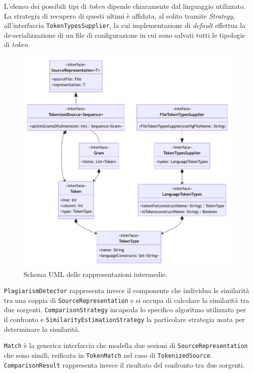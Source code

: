 L'elenco dei possibili tipi di \textit{token} dipende chiaramente dal linguaggio utilizzato.
%
La strategia di recupero di questi ultimi è affidata, al solito tramite \textit{Strategy}, all'interfaccia \texttt{TokenTypesSupplier}, la cui implementazione di \textit{default} effettua la de-serializzazione di un file di configurazione in cui sono salvati tutti le tipologie di \textit{token}.

\begin{figure}[h!]
    \centering
    \includegraphics[width=\textwidth]{resources/img/02-representations.pdf}
    \caption{Schema UML delle rappresentazioni intermedie.}
    \label{img:02-representations}
\end{figure}

\texttt{PlagiarismDetector} rappresenta invece il componente che individua le similarità tra una coppia di \texttt{SourceRepresentation} e si occupa di calcolare la similarità tra due sorgenti.
%
\texttt{ComparisonStrategy} incapsula lo specifico algoritmo utilizzato per il confronto e \texttt{SimilarityEstimationStrategy} la particolare strategia usata per determinare la similarità.

\texttt{Match} è la generica interfaccia che modella due sezioni di \texttt{SourceRepresentation} che sono simili, reificata in \texttt{TokenMatch} nel caso di \texttt{TokenizedSource}.
%
\texttt{ComparisonResult} rappresenta invece il risultato del confronto tra due sorgenti.

